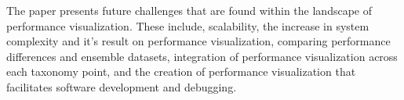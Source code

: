 %
%

The paper presents future challenges that are found within the landscape of performance visualization. These include, scalability, the increase in system complexity and it's result on performance visualization, comparing performance differences and ensemble datasets, integration of performance visualization across each taxonomy point, and the creation of performance visualization that facilitates software development and debugging.


